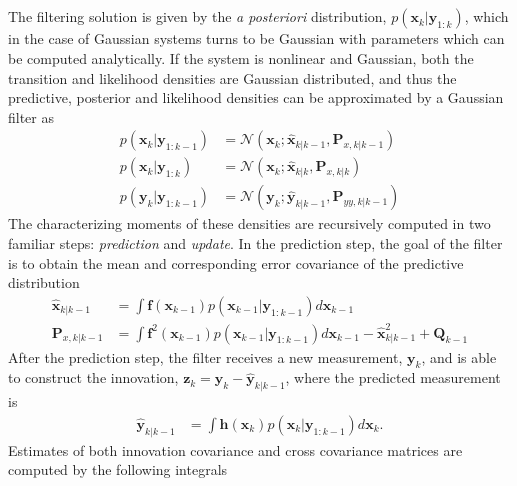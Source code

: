 \subsection{}\label{sec:B2}

The filtering solution is given by the \textit{a posteriori} distribution, $p(\mathbf{x}_{k}| \mathbf{y}_{1:k})$, which in the case of Gaussian systems turns to be Gaussian with parameters which can be computed analytically. If the system is nonlinear and Gaussian, both the transition and likelihood densities are Gaussian distributed, and thus the predictive, posterior and likelihood densities can be approximated by a Gaussian filter \cite{Ito-00,Sarkka13} as
\begin{align}
p(\mathbf{x}_{k} | \mathbf{y}_{1:k-1}) &= \mathcal{N}\left(\mathbf{x}_{k} ; \hat{\mathbf{x}}_{k|k-1},  \bm{ P}_{x,k|k-1} \right) \label{eq:gauss} \\
p(\mathbf{x}_{k} | \mathbf{y}_{1:k}) &= \mathcal{N}\left(\mathbf{x}_{k} ; \hat{\mathbf{x}}_{k|k},  \bm{ P}_{x,k|k} \right) \\
p(\mathbf{y}_{k} | \mathbf{y}_{1:k-1}) &= \mathcal{N}\left(\mathbf{y}_{k} ; \hat{\mathbf{y}}_{k|k-1},  \bm{ P}_{yy,k|k-1} \right) 
\end{align}
The characterizing moments of these densities are recursively computed in two familiar steps: \emph{prediction} and  \emph{update}. In the prediction step, the goal of the filter is to obtain the mean and corresponding error covariance of the predictive distribution
\begin{align}
\hat{\mathbf{x}}_{k|k-1} &= \int \mathbf{f}(\mathbf{x}_{k-1}) p(\mathbf{x}_{k-1}|\mathbf{y}_{1:k-1}) d\mathbf{x}_{k-1} \label{eq:prediction_mean} \\
\mathbf{ P}_{x,k|k-1}  &= \int \mathbf{f}^2(\mathbf{x}_{k-1}) p(\mathbf{x}_{k-1}|\mathbf{y}_{1:k-1}) d\mathbf{x}_{k-1} -\hat{\mathbf{x}}_{k|k-1}^2 + \mathbf{Q}_{k-1} \label{eq:prediction_cov}
\end{align} 
\normalsize
After the prediction step, the filter receives a new measurement, $\mathbf{y}_{k}$, and is able to construct the  innovation, $\mathbf{z}_{k} = \mathbf{y}_{k} - \hat{\mathbf{y}}_{k|k-1}$, where the predicted measurement is
\begin{align}
\hat{\mathbf{y}}_{k|k-1} &= \int \mathbf{h}(\mathbf{x}_{k}) p(\mathbf{x}_{k}| \mathbf{y}_{1:k-1}) d\mathbf{x}_{k}. \label{eq:pred_y}
\end{align}
\normalsize
Estimates of both innovation covariance and cross covariance matrices are computed by the following integrals
